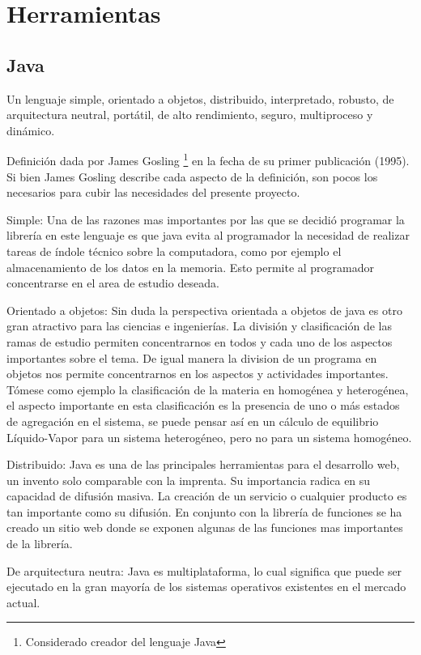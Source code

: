 \chapter{Herramientas}
	\section{Java}
		Un lenguaje simple, orientado a objetos, distribuido, interpretado, robusto, de arquitectura neutral, portátil, de alto rendimiento, seguro, multiproceso y dinámico.\cite{java} 

		Definición dada por James Gosling \footnote{Considerado creador del lenguaje Java}  en la fecha de su primer publicación (1995). Si bien James Gosling describe cada aspecto de la definición, son pocos los necesarios para cubir las necesidades del presente proyecto.

		\begin{description}
		\item{Simple:} Una de las razones mas importantes por las que se decidió programar la librería en este lenguaje es que java evita al programador la necesidad de realizar tareas de índole técnico sobre la computadora, como por ejemplo el almacenamiento de los datos en la memoria. Esto permite al programador concentrarse en el area de estudio deseada.

		\item{Orientado a objetos:}
		Sin duda la perspectiva orientada a objetos de java es otro gran atractivo para las ciencias e ingenierías. La división y clasificación de las ramas de estudio permiten concentrarnos en todos y cada uno de los aspectos importantes sobre el tema. De igual manera la division de un programa en objetos nos permite concentrarnos en los aspectos y actividades importantes. Tómese como ejemplo la clasificación de la materia en homogénea y heterogénea, el aspecto importante en esta clasificación es la presencia de uno o más estados de agregación en el sistema, se puede pensar así en un cálculo de equilibrio Líquido-Vapor para un sistema heterogéneo, pero no para un sistema homogéneo.

		\item{Distribuido:}
		Java es una de las principales herramientas para el desarrollo web, un invento solo comparable con la imprenta. Su importancia radica en su capacidad de difusión masiva. La creación de un servicio o cualquier producto es tan importante como su difusión. En conjunto con la librería de funciones se ha creado un sitio web donde se exponen algunas de las funciones mas importantes de la librería.

		\item{De arquitectura neutra:}
		Java es multiplataforma, lo cual significa que puede ser ejecutado en la gran mayoría de los sistemas operativos existentes en el mercado actual.

		\end{description}

